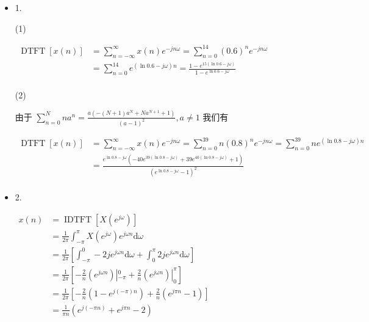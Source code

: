 \documentclass[a4paper,UTF8]{article}
\numberwithin{equation}{section}
\begin{document}
	\begin{framed}
		\begin{spacing}{1.5}
			\begin{itemize}
        \item 1.

        (1)
        
        $
        \begin{aligned}
        \operatorname{DTFT}[x(n)] & = \sum_{n=-\infty}^{\infty}x(n)e^{-jn\omega} = \sum_{n=0}^{14}(0.6)^{n}e^{-jn\omega}  \\
        & = \sum_{n=0}^{14}e^{(\ln 0.6-j\omega)n} = \frac{1-e^{15(\ln 0.6-j\omega)}}{1 - e^{\ln 0.6-j\omega}}  \\
        \end{aligned}
        $
        
        (2)
        
        由于 $\displaystyle \sum_{n=0}^{N}n a^{n} = \frac{a (- (N+1) a^{N} + N a^{N + 1} + 1)}{(a - 1)^{2}}, a \neq 1$ 我们有
        
        $
        \begin{aligned}
        \operatorname{DTFT}[x(n)] & = \sum_{n=-\infty}^{\infty}x(n)e^{-jn\omega} = \sum_{n=0}^{39}n(0.8)^{n}e^{-jn\omega} = \sum_{n=0}^{39}ne^{(\ln 0.8-j\omega)n}  \\
        &= \frac{e^{\ln 0.8-j\omega} (- 40 e^{39(\ln 0.8-j\omega)} + 39 e^{40(\ln 0.8-j\omega)} + 1)}{(e^{\ln 0.8-j\omega} - 1)^{2}}  \\
        \end{aligned}
        $
        
        \item 2.
        
        $
        \begin{aligned}
        x(n) &= \operatorname{IDTFT}[X(e^{j\omega})]  \\
        &= \frac{1}{2\pi}\int_{-\pi}^{\pi}X(e^{j\omega})e^{j\omega n}\mathrm{d}\omega  \\
        &= \frac{1}{2\pi}[\int_{-\pi}^{0}-2j e^{j\omega n}\mathrm{d}\omega + \int_{0}^{\pi}2j e^{j\omega n}\mathrm{d}\omega]  \\
        &= \frac{1}{2\pi}[-\frac{2}{n}(e^{j\omega n})|_{-\pi}^{0} + \frac{2}{n} (e^{j\omega n})|_{0}^{\pi}]  \\
        &= \frac{1}{2\pi}[-\frac{2}{n}(1 - e^{j(-\pi) n}) + \frac{2}{n} (e^{j \pi n} - 1)]  \\
        &= \frac{1}{\pi n}(e^{j (-\pi n)} + e^{j \pi n} - 2)  \\
        \end{aligned}
        $
			\end{itemize}
		\end{spacing}
	\end{framed}
	
\end{document}
